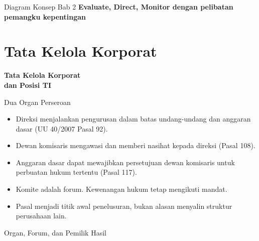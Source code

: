 \documentclass[aspectratio=169, table, 12pt]{beamer}
\begin{document}
\begin{frame}{{\Large Diagram Konsep Bab 2}}
  \centering
  {\small\bfseries Evaluate, Direct, Monitor dengan pelibatan pemangku kepentingan}\par\medskip
  \label{fig:session02-ilustrasi-bab}
\end{frame}

\section{Tata Kelola Korporat}

\begin{frame}{\hfill}
  \centering
  \Huge{\textbf{Tata Kelola Korporat\\dan Posisi TI}}
\end{frame}

\begin{frame}{{\Large Dua Organ Perseroan}}
  \vspace{4pt}
  \small
  \begin{itemize}
    \item Direksi menjalankan pengurusan dalam batas undang-undang dan anggaran dasar (UU 40/2007
          Pasal 92).
    \item Dewan komisaris mengawasi dan memberi nasihat kepada direksi (Pasal 108).
    \item Anggaran dasar dapat mewajibkan persetujuan dewan komisaris untuk perbuatan hukum
          tertentu (Pasal 117).
    \item Komite adalah forum. Kewenangan hukum tetap mengikuti mandat.
    \item Pasal menjadi titik awal penelusuran, bukan alasan menyalin struktur perusahaan lain.
  \end{itemize}
\end{frame}

\begin{frame}{{\Large Organ, Forum, dan Pemilik Hasil}}
  \centering
  \resizebox{!}{0.74\textheight}{}
\end{frame}
\end{document}
